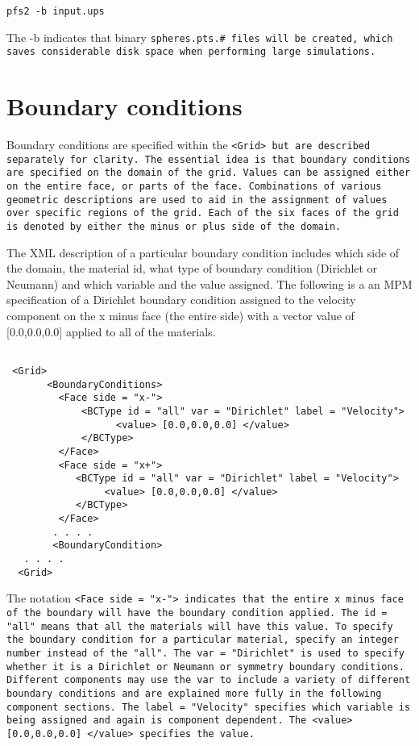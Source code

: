 \begin{Verbatim}[fontsize=\footnotesize]
   pfs2 -b input.ups
\end{Verbatim}

The -b indicates that binary \tt spheres.pts.\# \normalfont files will be created, which
saves considerable disk space when performing large simulations.


\section{Boundary conditions}\label{sec:ucf_bc}

Boundary conditions are specified within the \tt <Grid> \normalfont
but are described separately for clarity.  The essential idea is that
boundary conditions are specified on the domain of the grid.  Values
can be assigned either on the entire face, or parts of the face.
Combinations of various geometric descriptions are used to aid in the
assignment of values over specific regions of the grid.  Each of the
six faces of the grid is denoted by either the minus or plus side of
the domain.

The XML description of a particular boundary condition includes which
side of the domain, the material id, what type of boundary condition
(Dirichlet or Neumann) and which variable and the value assigned.  The
following is a an MPM specification of a Dirichlet boundary condition
assigned to the velocity component on the x minus face (the entire
side) with a vector value of [0.0,0.0,0.0] applied to all of the materials.

\begin{Verbatim}[fontsize=\footnotesize]

 <Grid>
       <BoundaryConditions>
         <Face side = "x-">
             <BCType id = "all" var = "Dirichlet" label = "Velocity">
                   <value> [0.0,0.0,0.0] </value>
             </BCType>
         </Face>
         <Face side = "x+">
            <BCType id = "all" var = "Dirichlet" label = "Velocity">
                 <value> [0.0,0.0,0.0] </value>
            </BCType>
         </Face>
        . . . .
        <BoundaryCondition>
   . . . .
  <Grid>

\end{Verbatim}

The notation \tt <Face side = "x-"> \normalfont indicates that the
entire x minus face of the boundary will have the boundary condition
applied.  The \tt id = "all" \normalfont means that all the
materials will have this value.  To specify the boundary condition for
a particular material, specify an integer number instead of the
"all".  The \tt var = "Dirichlet" \normalfont is used to specify
whether it is a Dirichlet or Neumann or symmetry boundary conditions.
Different components may use the \tt var \normalfont to include a
variety of different boundary conditions and are explained more fully
in the following component sections.  The \tt label = "Velocity"
\normalfont specifies which variable is being assigned and again is
component dependent.  The \tt <value> [0.0,0.0,0.0] </value>
\normalfont specifies the value.

